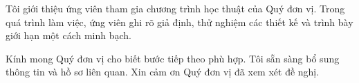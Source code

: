 Tôi giới thiệu ứng viên tham gia chương trình học thuật của Quý đơn vị. Trong quá trình làm việc, ứng viên ghi rõ giả định, thử nghiệm các thiết kế và trình bày giới hạn một cách minh bạch.

Kính mong Quý đơn vị cho biết bước tiếp theo phù hợp. Tôi sẵn sàng bổ sung thông tin và hồ sơ liên quan. Xin cảm ơn Quý đơn vị đã xem xét đề nghị.

